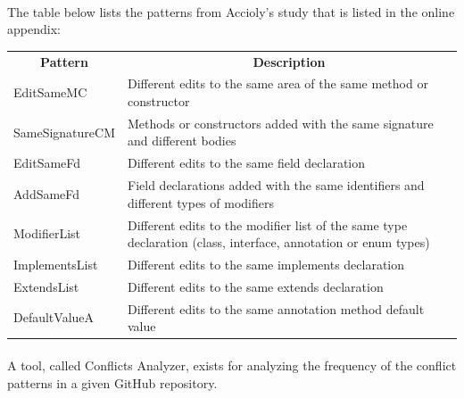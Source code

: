 \paragraph*{}
The table below lists the patterns from Accioly’s study that is listed in the online appendix:\\ %
\begin{tabular}{| l | p{12cm} |}
\hline
\multicolumn{1}{c}{\textbf{Pattern}} & \multicolumn{1}{c}{\textbf{Description}}\\
EditSameMC & Different edits to the same area of the same method or constructor\\
SameSignatureCM & Methods or constructors added with the same signature and different bodies\\
EditSameFd & Different edits to the same field declaration\\
AddSameFd & Field declarations added with the same identifiers and different types of modifiers\\
ModifierList & Different edits to the modifier list of the same type declaration (class, interface, annotation or enum types)\\
ImplementsList & Different edits to the same implements declaration\\
ExtendsList & Different edits to the same extends declaration\\
DefaultValueA & Different edits to the same annotation method default value
\end{tabular}
\paragraph*{}
A tool, called Conflicts Analyzer, exists for analyzing the frequency of the conflict patterns in a given GitHub repository.